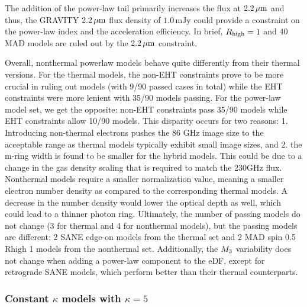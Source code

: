 
The addition of the power-law tail primarily increases the flux at $2.2\,\mu\mathrm{m}$ and thus, the GRAVITY $2.2\,\mu\mathrm{m}$ flux density of $1.0\,\mathrm{mJy}$ could provide a constraint on the power-law index and the acceleration efficiency.
In brief, $R_\mathrm{high}=1$ and $40$ MAD models are ruled out by the $2.2\,\mu\mathrm{m}$ constraint.


Overall, \hamr nonthermal powerlaw models behave quite differently from their thermal versions.
For the thermal models, the non-EHT constraints prove to be more crucial in ruling out models (with 9/90 passed cases in total) while the EHT constraints were more lenient with 35/90 models passing.
For the power-law model set, we get the opposite: non-EHT constraints pass 35/90 models while EHT constraints allow 10/90 models.
This disparity occurs for two reasons:
1. Introducing non-thermal electrons pushes the 86 GHz image size to the acceptable range as thermal models typically exhibit small image sizes, and
2. the m-ring width is found to be smaller for the hybrid models.
This could be due to a change in the gas density scaling that is required to match the 230GHz flux.
Nonthermal models require a smaller normalization value, meaning a smaller electron number density as compared to the corresponding thermal models.
A decrease in the number density would lower the optical depth as well, which could lead to a thinner photon ring.
Ultimately, the number of passing models do not change (3 for thermal and 4 for nonthermal models), but the passing models are different: 2 SANE edge-on models from the thermal set and 2 MAD spin 0.5 Rhigh 1 models from the nonthermal set.
Additionally, the $M_{3}$ variability does not change when adding a power-law component to the eDF, except for retrograde SANE models, which perform better than their thermal counterparts.

\subsubsection{Constant \texorpdfstring{$\kappa$}{kappa} models with \texorpdfstring{$\kappa = 5$}{kappa = 5}}

